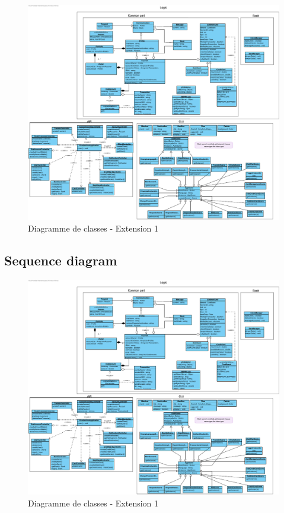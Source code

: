 \documentclass[]{report}
\begin{document}
\begin{figure}[h]
	\centering\includegraphics[width=\linewidth]{img/class-Extension-1.pdf}
	\caption{Diagramme de classes - Extension 1}
\end{figure}



\newpage

\subsection{Sequence diagram}
\begin{figure}[h]
	\centering\includegraphics[width=\linewidth]{img/class-Extension-1.pdf}
	\caption{Diagramme de classes - Extension 1}
\end{figure}
\end{document}
